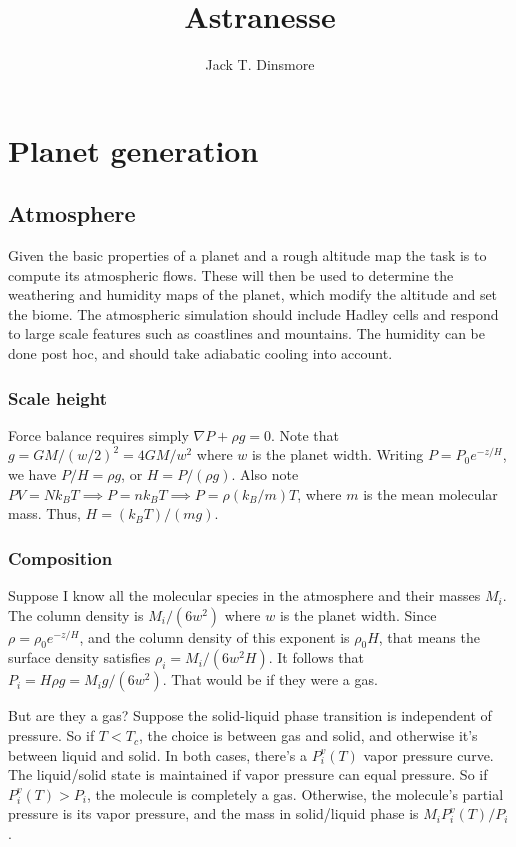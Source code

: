 \documentclass[11pt,twocolumn]{article}
\title{Astranesse}
\author{Jack T. Dinsmore}
\begin{document}
  \maketitle

  \section{Planet generation}
  \subsection{Atmosphere}
    Given the basic properties of a planet and a rough altitude map the task is to compute its atmospheric flows. These will then be used to determine the weathering and humidity maps of the planet, which modify the altitude and set the biome. The atmospheric simulation should include Hadley cells and respond to large scale features such as coastlines and mountains. The humidity can be done post hoc, and should take adiabatic cooling into account.

    \subsubsection{Scale height}
    Force balance requires simply $\nabla P + \rho g = 0$. Note that $g = GM/(w/2)^2 = 4GM/w^2$ where $w$ is the planet width. Writing $P = P_0 e^{-z/H}$, we have $P/H = \rho g$, or $H = P / (\rho g)$. Also note $PV = Nk_B T \implies P = n k_B T \implies P = \rho (k_B / m) T$, where $m$ is the mean molecular mass. Thus, $H = (k_B T) / (mg)$.

    \subsubsection{Composition}
    Suppose I know all the molecular species in the atmosphere and their masses $M_i$. The column density is $M_i / (6w^2)$ where $w$ is the planet width. Since $\rho = \rho_0 e^{-z/H}$, and the column density of this exponent is $\rho_0 H$, that means the surface density satisfies $\rho_i = M_i/(6w^2 H)$. It follows that $P_i = H\rho g = M_i g / (6w^2)$. That would be if they were a gas.

    But are they a gas? Suppose the solid-liquid phase transition is independent of pressure. So if $T<T_c$, the choice is between gas and solid, and otherwise it's between liquid and solid. In both cases, there's a $P^v_i(T)$ vapor pressure curve. The liquid/solid state is maintained if vapor pressure can equal pressure. So if $P^v_i(T) > P_i$, the molecule is completely a gas. Otherwise, the molecule's partial pressure is its vapor pressure, and the mass in solid/liquid phase is $M_i P^v_i(T) / P_i$. 
\end{document}

